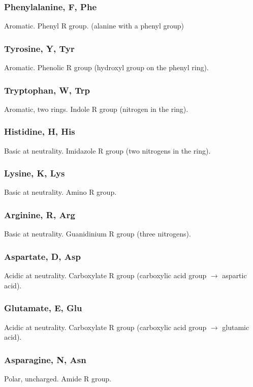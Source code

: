 \documentclass[letterpaper, 12pt]{article}
\begin{document}
\subsubsection*{Phenylalanine, F, Phe}
Aromatic. Phenyl R group. (alanine with a phenyl group)

\subsubsection*{Tyrosine, Y, Tyr}
Aromatic. Phenolic R group (hydroxyl group on the phenyl ring).

\subsubsection*{Tryptophan, W, Trp}
Aromatic, two rings. Indole R group (nitrogen in the ring).

\subsubsection*{Histidine, H, His}
Basic at neutrality. Imidazole R group (two nitrogens in the ring).

\subsubsection*{Lysine, K, Lys}
Basic at neutrality. Amino R group.

\subsubsection*{Arginine, R, Arg}
Basic at neutrality. Guanidinium R group (three nitrogens).

\subsubsection*{Aspartate, D, Asp}
Acidic at neutrality. Carboxylate R group (carboxylic acid group $\to$ aspartic acid).

\subsubsection*{Glutamate, E, Glu}
Acidic at neutrality. Carboxylate R group (carboxylic acid group $\to$ glutamic acid).

\subsubsection*{Asparagine, N, Asn}
Polar, uncharged. Amide R group.
\end{document}
